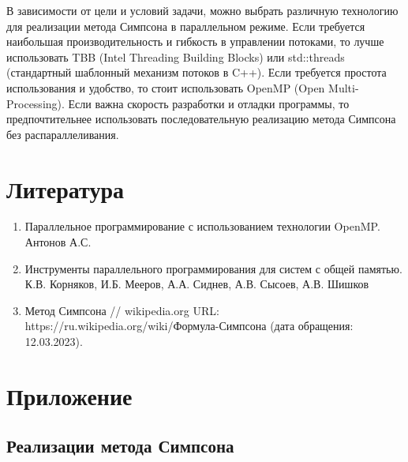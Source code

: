 \documentclass[14pt, a4paper]{extarticle}
\begin{document}
В зависимости от цели и условий задачи, можно выбрать различную технологию для реализации метода Симпсона в параллельном режиме. Если требуется наибольшая производительность и гибкость в управлении потоками, то лучше использовать TBB (Intel Threading Building Blocks) или std::threads (стандартный шаблонный механизм потоков в C++). Если требуется простота использования и удобство, то стоит использовать OpenMP (Open Multi-Processing). Если важна скорость разработки и отладки программы, то предпочтительнее использовать последовательную реализацию метода Симпсона без распараллеливания.
 
  \newpage

    \section{Литература}
    
    \begin{enumerate}
        \item Параллельное программирование с использованием технологии OpenMP. Антонов А.С.
        \item Инструменты параллельного программирования для систем с общей памятью. К.В. Корняков, И.Б. Мееров, А.А. Сиднев, А.В. Сысоев, А.В. Шишков
        \item  Метод Симпсона // wikipedia.org URL:\\ https://ru.wikipedia.org/wiki/Формула-Симпсона (дата обращения: 12.03.2023). 
    \end{enumerate}

  \newpage

  \section{Приложение}

  \subsection{Реализации метода Симпсона}
\end{document}
